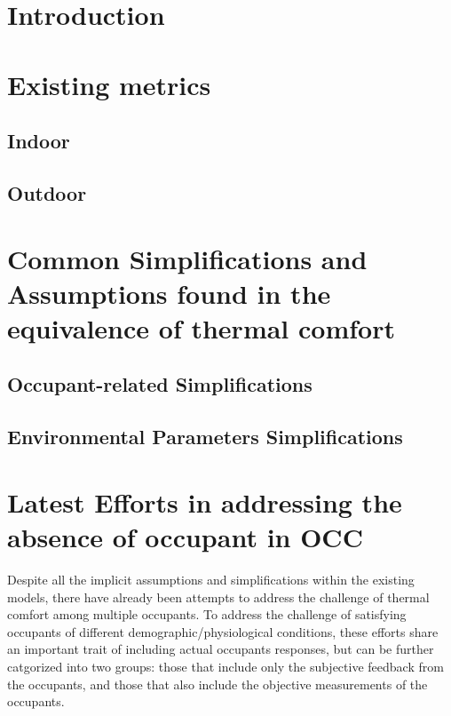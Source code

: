 \documentclass[review]{elsarticle}
\begin{document}
\section{Introduction}


\section{Existing metrics}
    \subsection{Indoor}
    
    \subsection{Outdoor} 
    

\section{Common Simplifications and Assumptions found in the equivalence of thermal comfort}
    \subsection{Occupant-related Simplifications}
    
    \subsection{Environmental Parameters Simplifications}
    
%         
%         
\section{Latest Efforts in addressing the absence of occupant in OCC}
Despite all the implicit assumptions and simplifications within the existing models, there have already been attempts to address the challenge of thermal comfort among multiple occupants. To address the challenge of satisfying occupants of different demographic/physiological conditions, these efforts share an important trait of including actual occupants responses, but can be further catgorized into two groups: those that include only the subjective feedback from the occupants, and those that also include the objective measurements of the occupants.
\end{document}
